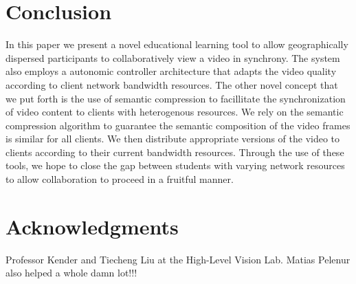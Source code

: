 \documentclass{sig-alternate}
\begin{document}
%

\section{Conclusion}

In this paper we present a novel educational learning tool to allow
geographically dispersed participants to collaboratively view a video
in synchrony.  The system also employs a autonomic controller
architecture that adapts the video quality according to client network
bandwidth resources.  The other novel concept that we put forth is the
use of semantic compression to facillitate the synchronization of
video content to clients with heterogenous resources.  We rely on the
semantic compression algorithm to guarantee the semantic composition
of the video frames is similar for all clients.  We then distribute
appropriate versions of the video to clients according to their
current bandwidth resources.  Through the use of these tools, we hope
to close the gap between students with varying network resources to
allow collaboration to proceed in a fruitful manner.



\section{Acknowledgments}
Professor Kender and Tiecheng Liu at the High-Level Vision Lab.
Matias Pelenur also helped a whole damn lot!!!




% 
\end{document}
